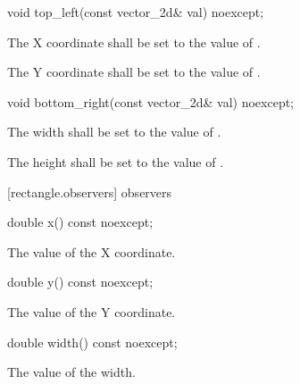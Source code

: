 \begin{itemdecl}
void top_left(const vector_2d& val) noexcept;
\end{itemdecl}
\begin{itemdescr}
	\pnum
	\effects
	The X coordinate shall be set to the value of .
	
	\effects
	The Y coordinate shall be set to the value of .
\end{itemdescr}

\begin{itemdecl}
void bottom_right(const vector_2d& val) noexcept;
\end{itemdecl}
\begin{itemdescr}
	\pnum
	\effects
	The width shall be set to the value of .
	
	\pnum
	The height shall be set to the value of .
\end{itemdescr}

 [rectangle.observers]{ observers}

\begin{itemdecl}
double x() const noexcept;
\end{itemdecl}
\begin{itemdescr}
	\pnum
	\returns
	The value of the X coordinate.
\end{itemdescr}

\begin{itemdecl}
double y() const noexcept;
\end{itemdecl}
\begin{itemdescr}
	\pnum
	\returns
	The value of the Y coordinate.
\end{itemdescr}

\begin{itemdecl}
double width() const noexcept;
\end{itemdecl}
\begin{itemdescr}
	\pnum
	\returns
	The value of the width.
\end{itemdescr}

